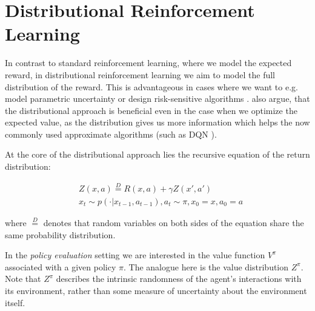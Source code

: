 

\section{Distributional Reinforcement Learning}\label{sec:prelim:distrl}

In contrast to standard reinforcement learning, where we model the expected reward, in distributional reinforcement learning \cite{many} we aim to model the full distribution of the reward. This is advantageous in cases where we want to e.g. model parametric uncertainty \cite{...} or design risk-sensitive algorithms \citep{morimura2012parametric}\citep{morimura2010nonparametric}. \citet{bellemare2017distributional} also argue, that the distributional approach is beneficial even in the case when we optimize the expected value, as the distribution gives us more information which helps the now commonly used approximate algorithms (such as DQN \citep{mnih2015human}).

At the core of the distributional approach lies the recursive equation of the return distribution:

\begin{equation}
\begin{split}
&Z(x, a) \overset{D}{=} R(x, a) + \gamma Z(x', a')\\
&x_t \sim p(\cdot|x_{t-1}, a_{t-1}), a_t \sim \pi, x_0 = x, a_0 = a
\end{split}
\end{equation}

where $\overset{D}{=}$ denotes that random variables on both sides of the equation share the same probability distribution.

In the \emph{policy evaluation} setting \citep{sutton1998reinforcement} we are interested in the value function $V^\pi$ associated with a given policy $\pi$. The analogue here is the value distribution $Z^\pi$. Note that $Z^\pi$ describes the intrinsic randomness of the agent's interactions with its environment, rather than some measure of uncertainty about the environment itself.
%

